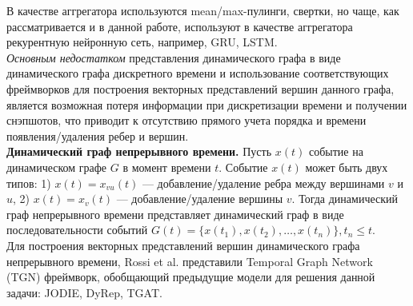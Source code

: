 \documentclass{mipt-thesis-ms}
\renewcommand{\leq}{\leqslant}  %
\begin{document}
В качестве аггрегатора используются mean/max-пулинги, свертки, но чаще, как рассматривается и в данной работе, используют в качестве аггрегатора рекурентную нейронную сеть, например, GRU, LSTM.\\

{\it Основным недостатком} представления динамического графа в виде динамического графа дискретного времени и использование соответствующих фреймворков для построения векторных представлений вершин данного графа, является возможная потеря информации при дискретизации времени и получении снэпшотов, что приводит к отсутствию прямого учета порядка и времени появления/удаления ребер и вершин.\\

{\bf Динамический граф непрерывного времени.} Пусть $x(t)$ событие на динамическом графе $G$ в момент времени $t$. Событие $x(t)$ может быть двух типов: 1) $x(t) = x_{vu}(t)$ --- добавление/удаление ребра между вершинами $v$ и $u$, 2) $x(t) = x_v(t)$ --- добавление/удаление вершины $v$. Тогда динамический граф непрерывного времени представляет динамический граф в виде последовательности событий $G(t) = \{x(t_1), x(t_2), \dots, x(t_n)\}, t_n \leq t$.\\

Для построения векторных представлений вершин динамического графа непрерывного времени, Rossi et al. представили Temporal Graph Network (TGN) фреймворк, обобщающий предыдущие модели для решения данной задачи: JODIE, DyRep, TGAT.\\
\end{document}
